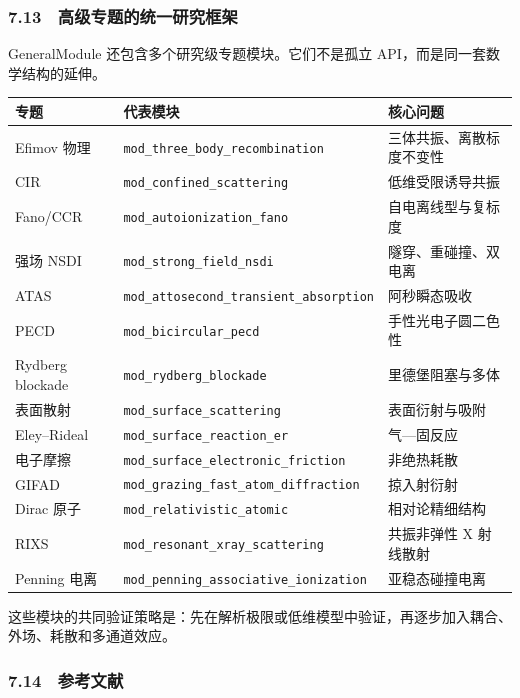 \documentclass[
]{ctexbook}
\begin{document}
\hypertarget{ux9ad8ux7ea7ux4e13ux9898ux7684ux7edfux4e00ux7814ux7a76ux6846ux67b6}{%
\subsubsection{7.13　高级专题的统一研究框架}\label{ux9ad8ux7ea7ux4e13ux9898ux7684ux7edfux4e00ux7814ux7a76ux6846ux67b6}}

GeneralModule 还包含多个研究级专题模块。它们不是孤立
API，而是同一套数学结构的延伸。

\begin{longtable}[]{@{}lll@{}}
\toprule
专题 & 代表模块 & 核心问题\tabularnewline
\midrule
\endhead
Efimov 物理 & \texttt{mod\_three\_body\_recombination} &
三体共振、离散标度不变性\tabularnewline
CIR & \texttt{mod\_confined\_scattering} &
低维受限诱导共振\tabularnewline
Fano/CCR & \texttt{mod\_autoionization\_fano} &
自电离线型与复标度\tabularnewline
强场 NSDI & \texttt{mod\_strong\_field\_nsdi} &
隧穿、重碰撞、双电离\tabularnewline
ATAS & \texttt{mod\_attosecond\_transient\_absorption} &
阿秒瞬态吸收\tabularnewline
PECD & \texttt{mod\_bicircular\_pecd} &
手性光电子圆二色性\tabularnewline
Rydberg blockade & \texttt{mod\_rydberg\_blockade} &
里德堡阻塞与多体\tabularnewline
表面散射 & \texttt{mod\_surface\_scattering} &
表面衍射与吸附\tabularnewline
Eley--Rideal & \texttt{mod\_surface\_reaction\_er} &
气---固反应\tabularnewline
电子摩擦 & \texttt{mod\_surface\_electronic\_friction} &
非绝热耗散\tabularnewline
GIFAD & \texttt{mod\_grazing\_fast\_atom\_diffraction} &
掠入射衍射\tabularnewline
Dirac 原子 & \texttt{mod\_relativistic\_atomic} &
相对论精细结构\tabularnewline
RIXS & \texttt{mod\_resonant\_xray\_scattering} & 共振非弹性 X
射线散射\tabularnewline
Penning 电离 & \texttt{mod\_penning\_associative\_ionization} &
亚稳态碰撞电离\tabularnewline
\bottomrule
\end{longtable}

这些模块的共同验证策略是：先在解析极限或低维模型中验证，再逐步加入耦合、外场、耗散和多通道效应。

\hypertarget{ux53c2ux8003ux6587ux732e-3}{%
\subsubsection{7.14　参考文献}\label{ux53c2ux8003ux6587ux732e-3}}
\end{document}
